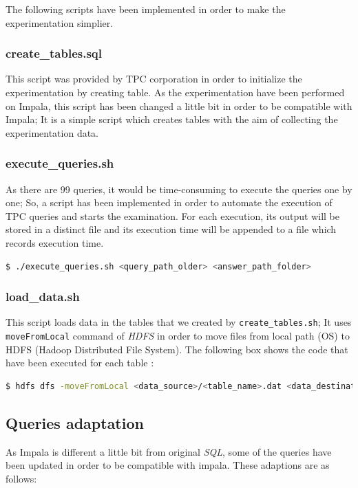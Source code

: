 \documentclass{article}
\newcommand\ita[1]{\textit{#1}}
\newcommand\pcw[1]{\texttt{#1}}
\begin{document}
The following scripts have been implemented in order to make the experimentation simplier.

\subsubsection{create\_tables.sql}

This script was provided by TPC corporation in order to initialize the experimentation by creating table. As the experimentation have been performed on Impala, this script has been changed a little bit in order to be compatible with Impala; It is a simple script which creates tables with the aim of collecting the experimentation data.

\subsubsection{execute\_queries.sh}



As there are 99 queries, it would be time-consuming to execute the queries one by one; So, a script has been implemented in order to automate the execution of TPC queries and starts the examination. For each execution, its output will be stored in a distinct file and its execution time will be appended to a file which records execution time.
\vspace{0.5cm}
\begin{lstlisting}[language=bash]
$ ./execute_queries.sh <query_path_older> <answer_path_folder>
\end{lstlisting}

\subsubsection{load\_data.sh}

This script loads data in the tables that we created by \pcw{create\_tables.sh}; It uses \pcw{moveFromLocal} command of \ita{HDFS} in order to move files from local path (OS) to HDFS (Hadoop Distributed File System). The following box shows the code that have been executed for each table :
\vspace{0.5cm}
\begin{lstlisting}[language=bash]
$ hdfs dfs -moveFromLocal <data_source>/<table_name>.dat <data_destination>/<table_name>;
\end{lstlisting}


\subsection{Queries adaptation}
As Impala is different a little bit from original \ita{SQL}, some of the queries have been updated in order to be compatible with impala. These adaptions are as follows:
\end{document}
